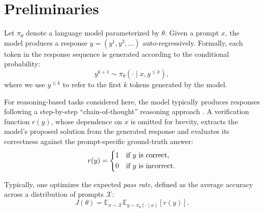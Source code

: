 \def\policy{\pi_\theta}
\def\reward{r}
\def\promptDist{\mathcal X}
\def\advantage{\mathcal A}
\newcommand{\prompt}{x}
\newcommand{\response}{y}
\newcommand{\trueanswer}{y^*}
\newcommand{\genacc}{\text{Acc}_\text{gen}(\theta)}
\newcommand{\veracc}{\text{Acc}_\text{ver}(\theta,n)}
\newcommand{\verify}{\text{Verify}}
\newcommand{\verifier}{f}
\newcommand{\rewardver}{R_v}
\newcommand{\rpos}{r_{\text{pos}}}
\newcommand{\rneg}{r_{\text{neg}}}


\section{Preliminaries}


Let $\policy$ denote a language model parameterized by $\theta$. Given a prompt $\prompt$, the model produces a response $\response = (\response^{1}, \response^{2}, \dots)$ auto-regressively. Formally, each token in the response sequence is generated according to the conditional probability:
\begin{equation}
    \response^{k+1} \sim \policy(\cdot \mid \prompt, \response^{\leq k}),
\end{equation}
where we use $\response^{\leq k}$ to refer to the first $k$ tokens generated by the model.

For reasoning-based tasks considered here, the model typically produces responses following a step-by-step ``chain-of-thought'' reasoning approach \citep{wei2022chain}. A verification function $\reward(\response)$, whose dependence on $\prompt$ is omitted for brevity, extracts the model's proposed solution from the generated response and evaluates its correctness against the prompt-specific ground-truth answer:
\begin{equation}\label{eqn.def.reward.binary}
    r(\response) = \begin{dcases}
        1 & \text{if $\response$ is correct,}\\
        0 & \text{if $\response$ is incorrect.}
    \end{dcases}
\end{equation}

Typically, one optimizes the expected \emph{pass rate}, defined as the average accuracy across a distribution of prompts $\promptDist$: 
\begin{equation}\label{eqn.objective}
    J(\theta) = \mathbb{E}_{\prompt \sim \promptDist}\mathbb{E}_{\response \sim \policy(\cdot \mid \prompt)}[\reward(\response)].
\end{equation}

